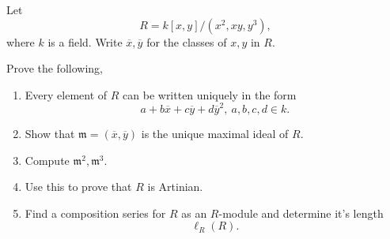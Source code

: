 \documentclass[11pt]{article}
\begin{document}
\begin{prob}
    Let 
    \[
        R = k[x,y] / (x^2, xy, y^3), 
    \]
    where $k$ is a field. Write $\overline x, \overline y$ 
    for the classes of $x,y$ in $R$. 

    Prove the following, 
    \begin{enumerate}
        \item Every element of $R$ can be written 
            uniquely in the form 
            \[
                a + b\overline x + c \overline y + 
                d \overline y^2, \ a,b,c,d\in k. 
            \]
        \item Show that $\mathfrak m = (\overline x, 
        \overline y)$ is the unique maximal ideal of $R$. 
        \item Compute $\mathfrak m^2, \mathfrak m^3$. 
        \item Use this to prove that $R$ is Artinian. 
        \item Find a composition series for $R$ as an 
            $R$-module and determine it's length 
            \[
                \ell_R(R). 
            \]
    \end{enumerate}
\end{prob}
\end{document}
